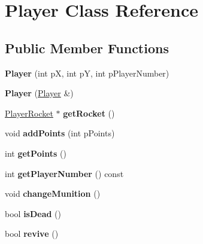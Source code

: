 \hypertarget{class_player}{\section{Player Class Reference}
\label{class_player}
}
\subsection*{Public Member Functions}
\begin{DoxyCompactItemize}
\item 
\hypertarget{class_player_a24659ea97da1acc913319776705aab94}{{\bfseries Player} (int p\-X, int p\-Y, int p\-Player\-Number)}\label{class_player_a24659ea97da1acc913319776705aab94}

\item 
\hypertarget{class_player_ad2d305f9af724e761a491b7a85a020e0}{{\bfseries Player} (\hyperlink{class_player}{Player} \&)}\label{class_player_ad2d305f9af724e761a491b7a85a020e0}

\item 
\hypertarget{class_player_ae994ea7007d6da03e2b07941ec57d487}{\hyperlink{class_player_rocket}{Player\-Rocket} $\ast$ {\bfseries get\-Rocket} ()}\label{class_player_ae994ea7007d6da03e2b07941ec57d487}

\item 
\hypertarget{class_player_a609d8bc41b5975dc84419ebf8499af78}{void {\bfseries add\-Points} (int p\-Points)}\label{class_player_a609d8bc41b5975dc84419ebf8499af78}

\item 
\hypertarget{class_player_ab98ee3c0e10f7b2b65ad43b2a2929445}{int {\bfseries get\-Points} ()}\label{class_player_ab98ee3c0e10f7b2b65ad43b2a2929445}

\item 
\hypertarget{class_player_ad6220515daeec578e4edcebb0b304df4}{int {\bfseries get\-Player\-Number} () const }\label{class_player_ad6220515daeec578e4edcebb0b304df4}

\item 
\hypertarget{class_player_a2c86a52ca55e44e2de9115e0c736a155}{void {\bfseries change\-Munition} ()}\label{class_player_a2c86a52ca55e44e2de9115e0c736a155}

\item 
\hypertarget{class_player_ac0b88c415cb264d54c227dd4ef82a7d1}{bool {\bfseries is\-Dead} ()}\label{class_player_ac0b88c415cb264d54c227dd4ef82a7d1}

\item 
\hypertarget{class_player_a0a1f2222ab92d321474bd52147a2b1df}{bool {\bfseries revive} ()}\label{class_player_a0a1f2222ab92d321474bd52147a2b1df}


\end{DoxyCompactItemize}
